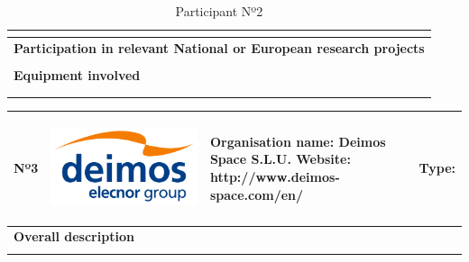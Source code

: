 \begin{longtable}[H]{|p{0.7cm}|p{4cm}|p{7cm}|p{1.3cm}|}
	\multicolumn{4}{|p{13cm}|}{}  \\ \hline
	
	\multicolumn{4}{|p{13cm}|}{\textbf{Participation in relevant National or European research projects}}  \\ \hline
	
	\multicolumn{4}{|p{13cm}|}{}  \\ \hline
	
	\multicolumn{4}{|p{13cm}|}{\textbf{Equipment involved}}  \\ \hline
	
	\multicolumn{4}{|p{13cm}|}{}  \\ \hline
	\caption{Participant Nº2}
\end{longtable}

\begin{longtable}[H]{|p{0.7cm}|p{4cm}|p{7cm}|p{1.3cm}|}
	\hline
	\begin{center} Nº3 \end{center} & \begin{center} \includegraphics[scale=0.05]{./logos/Blue-Logo_White-Background_EN} \end{center} & \begin{center} \textbf{Organisation name:} Deimos Space S.L.U. \newline \textbf{Website:} http://www.deimos-space.com/en/ \end{center} & \begin{center} Type: \end{center} \\ \hline
	
	\multicolumn{4}{|p{13cm}|}{\textbf{Overall description}}  \\ \hline
	
	\multicolumn{4}{|p{13cm}|}{}  \\ \hline
	

\end{longtable}
